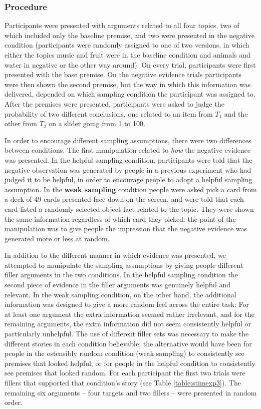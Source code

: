 \documentclass[authoryear,11pt]{elsarticle}
\begin{document}
\subsubsection{Procedure}

Participants were presented with arguments related to all four topics, two of which included only the {\sc baseline} premise, and two were presented in the {\sc negative} condition (participants were randomly assigned to one of two versions, in which either the topics music and fruit were in the {\sc baseline} condition and animals and water in {\sc negative} or the other way around). On every trial, participants were first presented with the base premise. On the {\sc negative} evidence trials participants were then shown the second premise, but the way in which this information was delivered, depended on which sampling condition the participant was assigned to. After the premises were presented, participants were asked to judge the probability of two different conclusions, one related to an item from $T_1$ and the other from $T_2$ on a slider going from 1 to 100.

In order to encourage different sampling assumptions, there were two differences between conditions. The first manipulation related to {\it how} the negative evidence was presented. In the {\sc helpful sampling} condition, participants were told that the negative observation was generated by people in a previous experiment who had judged it to be helpful, in order to encourage people to adopt a helpful sampling assumption. In the \textbf{\sc weak sampling} condition people were asked pick a card from a deck of 49 cards presented face down on the screen, and were told that each card listed a randomly selected object fact related to the topic. They were shown the same information regardless of which card they picked: the point of the manipulation was to give people the impression that the negative evidence was generated more or less at random.

In addition to the different manner in which evidence was presented, we attempted to manipulate the sampling assumptions by giving people different filler arguments in the two conditions. In the {\sc helpful sampling} condition the second piece of evidence in the filler arguments was genuinely helpful and relevant.  In the {\sc weak sampling} condition, on the other hand, the additional information was designed to give a more random feel across the entire task: For at least one argument the extra information seemed rather irrelevant, and for the remaining arguments, the extra information did not  seem consistently helpful or particularly unhelpful. The use of different filler sets was necessary to make the different stories in each condition believable: the alternative would have been for people in the ostensibly random condition ({\sc weak sampling}) to consistently see premises that looked helpful, or for people in the {\sc helpful condition} to consistently see premises that looked random. For each participant the first two trials were fillers that supported that condition's story (see Table \ref{table:stimexp3}). The remaining six arguments -- four targets and two fillers -- were presented in random order.
\end{document}
